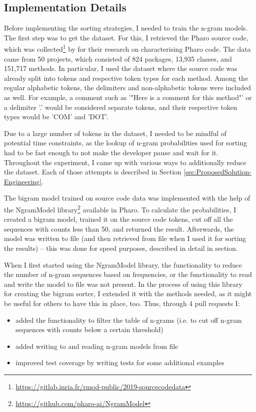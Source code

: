 \documentclass[sigplan,screen]{acmart}
\begin{document}
\subsection{Implementation Details}
Before implementing the sorting strategies, I needed to train the n-gram models. The first step was to get the dataset. For this, I retrieved the Pharo source code, which was collected\footnote{\url{https://gitlab.inria.fr/rmod-public/2019-sourcecodedata}} by \cite{Zait20a} for their research on characterising Pharo code. The data came from 50 projects, which consisted of 824 packages, 13,935 classes, and 151,717 methods. In particular, I used the dataset where the source code was already split into tokens and respective token types for each method. Among the regular alphabetic tokens, the delimiters and non-alphabetic tokens were included as well. For example, a comment such as '"Here is a comment for this method"' or a delimiter '.' would be considered separate tokens, and their respective token types would be 'COM' and 'DOT'.

Due to a large number of tokens in the dataset, I needed to be mindful of potential time constraints, as the lookup of n-gram probabilities used for sorting had to be fast enough to not make the developer pause and wait for it. Throughout the experiment, I came up with various ways to additionally reduce the dataset. Each of those attempts is described in Section \ref{sec:ProposedSolution-Engineering}.

The bigram model trained on source code data was implemented with the help of the NgramModel library\footnote{\url{https://github.com/pharo-ai/NgramModel}} available in Pharo. To calculate the probabilities, I created a bigram model, trained it on the source code tokens, cut off all the sequences with counts less than 50, and returned the result. Afterwards, the model was written to file (and then retrieved from file when I used it for sorting the results) -- this was done for speed purposes, described in detail in section.

When I first started using the NgramModel library, the functionality to reduce the number of n-gram sequences based on frequencies, or the functionality to read and write the model to file was not present. In the process of using this library for creating the bigram sorter, I extended it with the methods needed, as it might be useful for others to have this in place, too. Thus, through 4 pull requests I:
\begin{itemize}
    \item added the functionality to filter the table of n-grams (i.e. to cut off n-gram sequences with counts below a certain threshold)
    \item added writing to and reading n-gram models from file
    \item improved test coverage by writing tests for some additional examples
\end{itemize}
\end{document}
